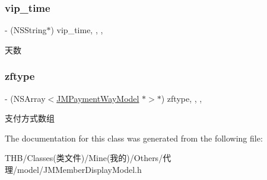 \subsubsection{\texorpdfstring{vip\+\_\+time}{vip\_time}}
{\footnotesize\ttfamily -\/ (N\+S\+String$\ast$) vip\+\_\+time\hspace{0.3cm}{\ttfamily [read]}, {\ttfamily [write]}, {\ttfamily [nonatomic]}, {\ttfamily [copy]}}

天数 \mbox{\label{interface_j_m_member_display_model_aa8721aaf3018c3b57fffc58465cd9d8d}} 
\subsubsection{\texorpdfstring{zftype}{zftype}}
{\footnotesize\ttfamily -\/ (N\+S\+Array$<$\mbox{\hyperlink{interface_j_m_payment_way_model}{J\+M\+Payment\+Way\+Model}} $\ast$$>$$\ast$) zftype\hspace{0.3cm}{\ttfamily [read]}, {\ttfamily [write]}, {\ttfamily [nonatomic]}, {\ttfamily [copy]}}

支付方式数组 

The documentation for this class was generated from the following file\+:\begin{DoxyCompactItemize}
\item 
T\+H\+B/\+Classes(类文件)/\+Mine(我的)/\+Others/代理/model/J\+M\+Member\+Display\+Model.\+h\end{DoxyCompactItemize}

